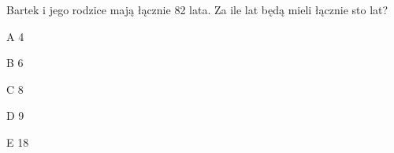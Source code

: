 \begin{tresc}
Bartek i jego rodzice mają łącznie 82 lata. Za ile lat będą mieli łącznie sto lat?
\end{tresc}
\begin{wariant}{A} 4 \end{wariant}
\begin{wariant}{B} 6 \end{wariant}
\begin{wariant}{C} 8 \end{wariant}
\begin{wariant}{D} 9 \end{wariant}
\begin{wariant}{E} 18 \end{wariant}
